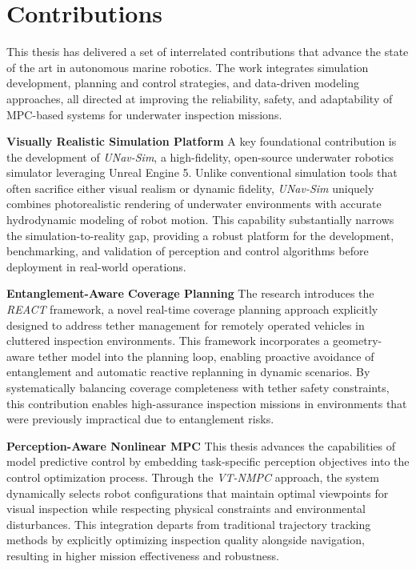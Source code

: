 \section{Contributions}

This thesis has delivered a set of interrelated contributions that advance the state of the art in autonomous marine robotics. The work integrates simulation development, planning and control strategies, and data-driven modeling approaches, all directed at improving the reliability, safety, and adaptability of \ac{MPC}-based systems for underwater inspection missions.

\noindent \textbf{Visually Realistic Simulation Platform}  
A key foundational contribution is the development of \textit{UNav-Sim}, a high-fidelity, open-source underwater robotics simulator leveraging Unreal Engine 5. Unlike conventional simulation tools that often sacrifice either visual realism or dynamic fidelity, \textit{UNav-Sim} uniquely combines photorealistic rendering of underwater environments with accurate hydrodynamic modeling of robot motion. This capability substantially narrows the simulation-to-reality gap, providing a robust platform for the development, benchmarking, and validation of perception and control algorithms before deployment in real-world operations.

\vspace{0.75em}

\noindent \textbf{Entanglement-Aware Coverage Planning}  
The research introduces the \textit{REACT} framework, a novel real-time coverage planning approach explicitly designed to address tether management for remotely operated vehicles in cluttered inspection environments. This framework incorporates a geometry-aware tether model into the planning loop, enabling proactive avoidance of entanglement and automatic reactive replanning in dynamic scenarios. By systematically balancing coverage completeness with tether safety constraints, this contribution enables high-assurance inspection missions in environments that were previously impractical due to entanglement risks.

\vspace{0.75em}

\noindent \textbf{Perception-Aware Nonlinear MPC}  
This thesis advances the capabilities of model predictive control by embedding task-specific perception objectives into the control optimization process. Through the \textit{VT-NMPC} approach, the system dynamically selects robot configurations that maintain optimal viewpoints for visual inspection while respecting physical constraints and environmental disturbances. This integration departs from traditional trajectory tracking methods by explicitly optimizing inspection quality alongside navigation, resulting in higher mission effectiveness and robustness.


